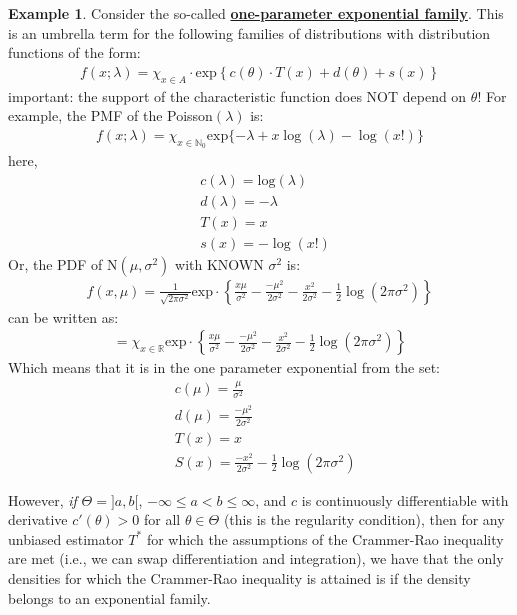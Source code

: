 \documentclass[11pt]{scrartcl}
\newcommand{\R}[0]{\mathbb{R}}
\theoremstyle{definition}
\newtheorem{ex}{Example}
\theoremstyle{remark}
\newcommand{\dfn}[1]{\textbf{\underline{#1}}}
\begin{document}
{\begin{ex} 
	Consider the so-called \dfn{one-parameter exponential family}. This is an umbrella term for the following families of distributions with distribution functions of the form: 
	\begin{align*}
		f(x;	\lambda) = \chi_{x \in A} \cdot \text{exp} \left\{ c(\theta) \cdot T(x) + d(\theta) + s(x) \right\} 
	\end{align*}
	important: the support of the characteristic function does NOT depend on $\theta$! For example, the PMF of the Poisson$(\lambda)$ is: 
	\begin{align*}
		f(x; \lambda ) = \chi_{ x \in \mathbb{N}_0 } \text{exp} \{ - \lambda + x \log (\lambda) - \log (x!) \} 	
	\end{align*}
	here, 
	\begin{align*}
		& c(\lambda) = \text{log}(\lambda) \\
		& d(\lambda) = - \lambda \\
		& T(x) = x \\
		& s(x) = - \log (x!) 	
	\end{align*}
	Or, the PDF of N$(\mu, \sigma^2)$ with KNOWN $\sigma^2$ is:
	\begin{align*}
		f(x, \mu) = \frac{1}{\sqrt{2 \pi \sigma^2}}	\text{exp} \cdot \left\{ 	\frac{x \mu}{\sigma^2} - \frac{-\mu^2}{2 \sigma^2} - \frac{x^2}{2 \sigma^2} - \frac{1}{2} \log(2 \pi \sigma^2) 	\right\} 
	\end{align*}
	can be written as: 
	\begin{align*}	
		= \chi_{x \in \R} 	\text{exp} \cdot \left\{ 	\frac{x \mu}{\sigma^2} - \frac{-\mu^2}{2 \sigma^2} - \frac{x^2}{2 \sigma^2} - \frac{1}{2} \log(2 \pi \sigma^2) 	\right\} 
	\end{align*}
	Which means that it is in the one parameter exponential from the set:
	\begin{align*} 
			& c(\mu) = \frac{\mu}{\sigma^2} \\
			& d(\mu) = \frac{-\mu^2}{2 \sigma^2} \\
			& T(x) = x \\
			& S(x) = \frac{-x^2}{2 \sigma^2} - \frac{1}{2} \log (2 \pi \sigma^2) 
	\end{align*}
\end{ex}

However, \emph{if} $\Theta = ]a, b[$, $-\infty \leq a < b \leq \infty$, and $c$ is continuously differentiable with derivative $c'(\theta) > 0$ for all $\theta \in \Theta$ (this is the regularity condition), then for any unbiased estimator $T^*$ for which the assumptions of the Crammer-Rao inequality are met (i.e., we can swap differentiation and integration), we have that the only densities for which the Crammer-Rao inequality is attained is if the density belongs to an exponential family. 

}
\end{document}
